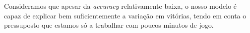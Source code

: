 Consideramos que apesar da \textit{accuracy} relativamente baixa, o nosso modelo é capaz de explicar bem suficientemente a variação em vitórias, tendo em conta o pressuposto que estamos só a trabalhar com poucos minutos de jogo.